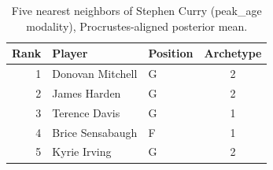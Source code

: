 \begin{table}[htbp]
  \centering\small
  \begin{tabular}{rllc}
    \toprule
    Rank & Player & Position & Archetype \\
    \midrule
    1 & Donovan Mitchell & G & 2 \\
    2 & James Harden & G & 2 \\
    3 & Terence Davis & G & 1 \\
    4 & Brice Sensabaugh & F & 1 \\
    5 & Kyrie Irving & G & 2 \\
    \bottomrule
  \end{tabular}
  \caption{Five nearest neighbors of Stephen Curry (peak_age modality), Procrustes-aligned posterior mean.}
  \label{tab:Stephen_Curry_neighbors_peak_age}
\end{table}

